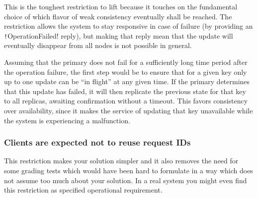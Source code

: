 \documentclass{article}
\begin{document}
This is the toughest restriction to lift because it touches on the  fundamental choice of which flavor of weak consistency eventually shall  be reached. The restriction allows the system to stay responsive in case  of failure (by providing an \texttt!OperationFailed! reply), but making that reply mean that the update will eventually disappear from all nodes is not possible in general.

Assuming that the primary does not fail for a sufficiently long time  period after the operation failure, the first step would be to ensure  that for a given key only up to one update can be “in flight”  at any given time. If the primary determines that this update has  failed, it will then replicate the previous state for that key to all  replicas, awaiting confirmation without a timeout. This favors  consistency over availability, since it makes the service of updating that key unavailable while the system is experiencing a malfunction.

\subsubsection{Clients are expected not to reuse request IDs}

This restriction makes your solution simpler and it also removes the  need for some grading tests which would have been hard to formulate in a  way which does not assume too much about your solution. In a real system you might even find this restriction as specified operational requirement.
\end{document}
